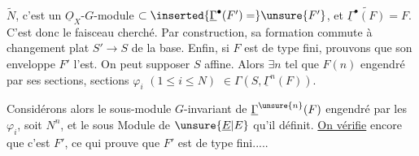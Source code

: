 
$\widetilde N$, c'est un $\underline{O}_X$-$G$-module  $\subset\inserted{\underline{\Gamma}^{\bullet}(F')=}\unsure{F'}$, et  $\widetilde{\underline{\Gamma}^{\bullet}(F)}=F$. C'est donc le  faisceau cherché. Par construction, sa formation commute à  changement plat $S'\to S$ de la base. Enfin, si $F$ est de type fini,  prouvons que son enveloppe $F'$ l'est. On peut supposer $S$ affine. Alors $\exists n$ tel que $F(n)$  engendré par ses sections,  sections $\varphi_i$ \deleted{$\unsure{\in}$} $(1\leq i\leq N)$ $\in\Gamma(S,\underline{\Gamma}^n(F))$.

Considérons alors le sous-module  $G$-invariant de $\underline{\Gamma}^{\unsure{n}}(F)$ engendré par les $\varphi_i$, soit $N^n$, et le sous Module de $\unsure{\underline E|E}$ qu'il définit. \uline{On vérifie} encore que c'est \uline{$F'$}, ce qui prouve que $F'$ est de type fini.....

